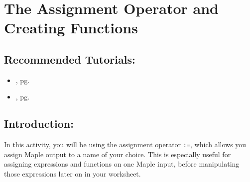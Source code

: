 \section{The Assignment Operator and Creating Functions}
\label{sec:assignment_operator_and_creating_functions}		

\subsection*{Recommended Tutorials:}
\begin{itemize}[noitemsep]
	\item {}, pg. \pageref{chp:plotting_functions}
	\item {}, pg. \pageref{chp:assignment_operator}
\end{itemize}

\subsection*{Introduction:}

In this activity, you will be using the assignment operator \texttt{:=}, which allows you assign Maple output to a name of your choice. This is especially useful for assigning expressions and functions on one Maple input, before manipulating those expressions later on in your worksheet.

